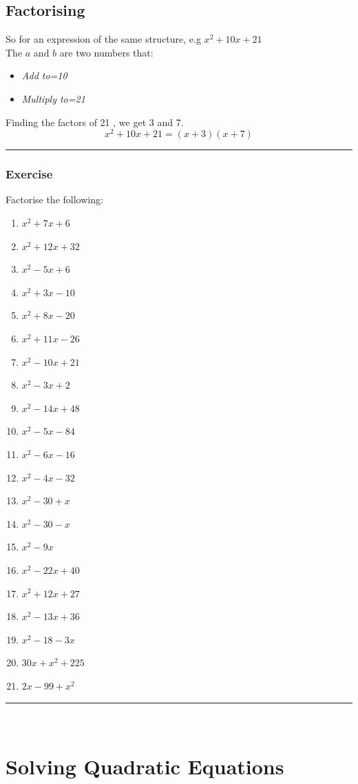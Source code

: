 \documentclass[a4paper,12pt]{article}
\newcommand\question{
	 \rule[0pt]{17cm}{0.5pt}\vspace{-0.5cm}
	\subsubsection{Exercise}

}
\newcommand\questionend{
	\rule[0pt]{17cm}{0.5pt}\vspace{0.0cm}\\
}
\begin{document}
\subsection{Factorising}
So for an expression of the same structure, e.g $x^2+10x+21$\\
The $a$ and $b$ are two numbers that:
\begin{itemize}
	\item   \emph{Add to=10} 
	\item   \emph{Multiply to=21}
\end{itemize} 
Finding the factors of 21 , we get  3 and 7.
$$x^2+10x+21=(x+3)(x+7)$$
\question
Factorise the following:
\begin{multicols}{2}
	\begin{enumerate}[label=\normalsize \alph*)~~~]
\item $ x^2 + 7x + 6 $ 
\item $ x^2 + 12x + 32 $ 
\item $ x^2 - 5x + 6$ 
\item $ x^2 + 3x - 10 $ 
\item $ x^2 + 8x - 20 $ 
\item $ x^2 + 11x - 26$ 
\item $ x^2 - 10x +21 $ 
\item $ x^2 - 3x + 2 $ 
\item $ x^2 - 14x + 48$ 
\item $ x^2 - 5x - 84 $ 
\item $ x^2 - 6x - 16 $ 
\item $ x^2 - 4x - 32$ 
\item $ x^2 - 30 + x $ 
\item $ x^2 - 30 - x $ 
\item $ x^2 - 9x$ 
\item $ x^2 - 22x + 40 $ 
\item $ x^2 + 12x + 27 $ 
\item $ x^2 - 13x + 36$ 
\item $ x^2 - 18 - 3x $ 
\item $ 30x + x^2 + 225 $ 
\item $ 2x - 99 + x^2$ 
	\end{enumerate}
\end{multicols}
\questionend
\newpage
\section{Solving Quadratic Equations}
\end{document}
